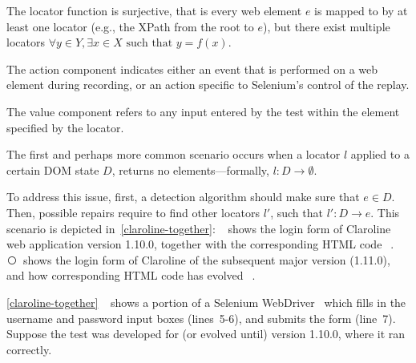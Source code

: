 The locator function is surjective, that is every web element $e$ is mapped to by at least one locator (e.g., the XPath from the root to $e$), but there exist multiple locators {$\displaystyle \forall y\in Y,\exists x\in X{\text{ such that }}y=f(x).$} 

\begin{defn}
The action component indicates either an event that is performed
on a web element during recording, or an action specific to Selenium's control of the replay.
\end{defn}

\begin{defn} The value component refers to any input entered by the test within the element specified by the locator.
\end{defn}

The first and perhaps more common scenario occurs when a locator $l$ applied to a certain DOM state $D$, returns no elements---formally, $l: D \rightarrow \emptyset$. 

To address this issue, first, a detection algorithm should make sure that $e \in D$. Then,  possible repairs require to find other locators $l'$, such that $l': D \rightarrow e$.
This scenario is depicted in~\autoref{claroline-together}: \textcircled{}~shows the login form of Claroline web application version 1.10.0, together with the corresponding HTML code~\textcircled{}. \textcircled{}~shows the login form of Claroline of the subsequent major version (1.11.0), and how corresponding HTML code has evolved~\textcircled{}. 

\autoref{claroline-together}~\textcircled{} shows a portion of a Selenium WebDriver~\cite{selenium} which 
fills in the username and password input boxes (lines~5-6), and submits the form (line~7). Suppose the test was developed for (or evolved until) version 1.10.0, where it ran correctly.

